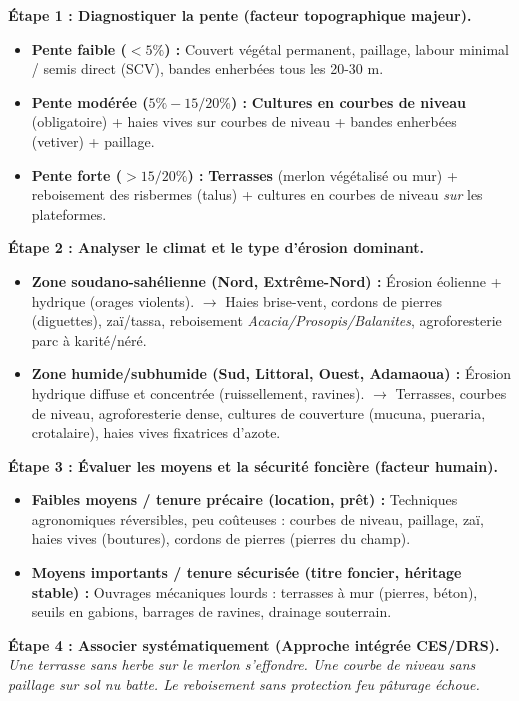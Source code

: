\documentclass[11pt]{article}
\begin{document}
\begin{methode}
\textbf{Étape 1 : Diagnostiquer la pente (facteur topographique majeur).}
\begin{itemize}
    \item \textbf{Pente faible ($< 5\%$) :} Couvert végétal permanent, paillage, labour minimal / semis direct (SCV), bandes enherbées tous les 20-30 m.
    \item \textbf{Pente modérée ($5\% - 15/20\%$) :} \textbf{Cultures en courbes de niveau} (obligatoire) + haies vives sur courbes de niveau + bandes enherbées (vetiver) + paillage.
    \item \textbf{Pente forte ($> 15/20\%$) :} \textbf{Terrasses} (merlon végétalisé ou mur) + reboisement des risbermes (talus) + cultures en courbes de niveau \emph{sur} les plateformes.
\end{itemize}

\textbf{Étape 2 : Analyser le climat et le type d'érosion dominant.}
\begin{itemize}
    \item \textbf{Zone soudano-sahélienne (Nord, Extrême-Nord) :} Érosion éolienne + hydrique (orages violents). $\rightarrow$ Haies brise-vent, cordons de pierres (diguettes), zaï/tassa, reboisement \emph{Acacia/Prosopis/Balanites}, agroforesterie parc à karité/néré.
    \item \textbf{Zone humide/subhumide (Sud, Littoral, Ouest, Adamaoua) :} Érosion hydrique diffuse et concentrée (ruissellement, ravines). $\rightarrow$ Terrasses, courbes de niveau, agroforesterie dense, cultures de couverture (mucuna, pueraria, crotalaire), haies vives fixatrices d'azote.
\end{itemize}

\textbf{Étape 3 : Évaluer les moyens et la sécurité foncière (facteur humain).}
\begin{itemize}
    \item \textbf{Faibles moyens / tenure précaire (location, prêt) :} Techniques agronomiques réversibles, peu coûteuses : courbes de niveau, paillage, zaï, haies vives (boutures), cordons de pierres (pierres du champ).
    \item \textbf{Moyens importants / tenure sécurisée (titre foncier, héritage stable) :} Ouvrages mécaniques lourds : terrasses à mur (pierres, béton), seuils en gabions, barrages de ravines, drainage souterrain.
\end{itemize}

\textbf{Étape 4 : Associer systématiquement (Approche intégrée CES/DRS).} \emph{Une terrasse sans herbe sur le merlon s'effondre. Une courbe de niveau sans paillage sur sol nu batte. Le reboisement sans protection feu pâturage échoue.}
\end{methode}
\end{document}

